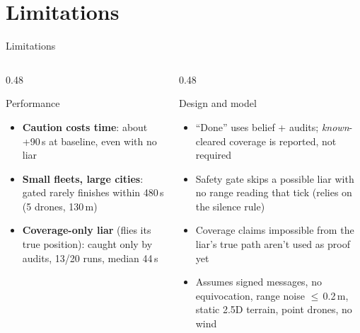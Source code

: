 \documentclass[aspectratio=169,10pt]{beamer}
\begin{document}
\section{Limitations}

\begin{frame}{Limitations}
\begin{columns}[T]
\begin{column}{0.48\textwidth}
\begin{block}{Performance}
\begin{itemize}\small
  \item \textbf{Caution costs time}: about +90\,s at baseline, even with no liar
  \item \textbf{Small fleets, large cities}: gated rarely finishes within 480\,s (5 drones, 130\,m)
  \item \textbf{Coverage-only liar} (flies its true position): caught only by audits, 13/20 runs, median 44\,s
\end{itemize}
\end{block}
\end{column}
\begin{column}{0.48\textwidth}
\begin{block}{Design and model}
\begin{itemize}\small
  \item ``Done'' uses belief + audits; \emph{known}-cleared coverage is reported, not required
  \item Safety gate skips a possible liar with no range reading that tick (relies on the silence rule)
  \item Coverage claims impossible from the liar's true path aren't used as proof yet
  \item Assumes signed messages, no equivocation, range noise $\le$\,0.2\,m, static 2.5D terrain, point drones, no wind
\end{itemize}
\end{block}
\end{column}
\end{columns}
\end{frame}

\end{document}
